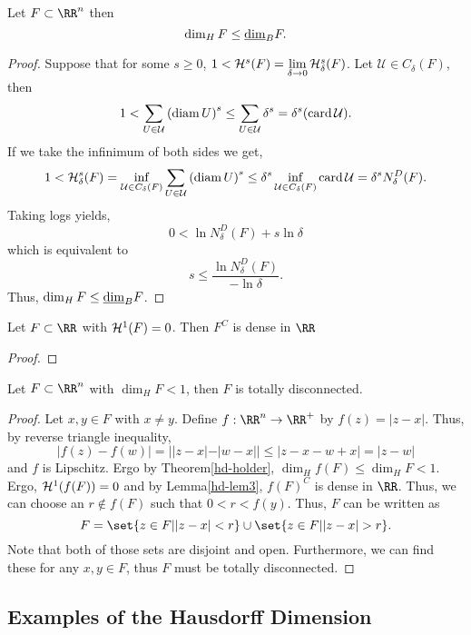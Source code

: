 \begin{thm}
	Let $F\subset\RR^n$ then
	\[
		\operatorname{dim}_H F \leq \underline{\operatorname{dim}}_B F.
	\]
\end{thm}
\begin{proof}
	Suppose that for some $s\geq 0$, $1<\mathcal{H}^s(F)=\lim\limits_{\delta\rightarrow 0}\mathcal{H}^s_\delta(F)$.
	Let $\mathcal{U}\in C_\delta(F)$, then
	\[
		1 < \sum_{U\in\mathcal{U}}{(\operatorname{diam} U)}^s
		\leq\sum_{U\in\mathcal{U}}\delta^s
		=\delta^s (\operatorname{card} \mathcal{U}).
	\]
	If we take the infinimum of both sides we get,
	\[
		1 < \mathcal{H}^s_\delta(F)
		=\inf_{\mathcal{U}\in C_\delta(F)}\sum_{U\in\mathcal{U}} {(\operatorname{diam}{U})}^s
		\leq \delta^s\inf_{\mathcal{U}\in C_\delta(F)}\operatorname{card}{\mathcal{U}}
		=\delta^s N_\delta^D(F).
	\]
	Taking logs yields,
	\[
		0 < \ln N_\delta^D(F)+s\ln \delta
	\]
	which is equivalent to
	\[
		s\leq \frac{\ln N^D_\delta(F)}{-\ln\delta}.
	\]
	Thus, $\operatorname{dim}_H F\leq \underline{\operatorname{dim}}_B F$.
\end{proof}

\begin{lemma}\label{hd-lem3}
	Let $F\subset\RR$ with $\mathcal{H}^1(F) = 0$.
	Then $F^C$ is dense in $\RR$
\end{lemma}

\begin{proof}

\end{proof}

\begin{thm}
	Let $F\subset\RR^n$ with $\dim_H F < 1$, then $F$ is totally disconnected.
\end{thm}

\begin{proof}
	Let $x,y\in F$ with $x\neq y$.
	Define $f:\RR^n\rightarrow\RR^+$ by $f(z)=|z-x|$.
	Thus, by reverse triangle inequality,
	\[
		|f(z)-f(w)|=||z-x|-|w-x||\leq|z-x-w+x|=|z-w|
	\]
	and $f$ is Lipschitz.
	Ergo by Theorem\autoref{hd-holder}, $\dim_H f(F) \leq \dim_H F < 1$.
	Ergo, $\mathcal{H}^1(f(F))=0$ and by Lemma\autoref{hd-lem3}, ${f(F)}^C$ is dense in $\RR$.
	Thus, we can choose an $r\notin f(F)$ such that $0<r<f(y)$.
	Thus, $F$ can be written as
	\[
		F=\set{z\in F| |z-x|< r}\cup\set{z\in F| |z-x| >r}.
	\]
	Note that both of those sets are disjoint and open.
	Furthermore, we can find these for any $x,y\in F$, thus $F$ must be totally disconnected.
\end{proof}

\subsection{Examples of the Hausdorff Dimension}

